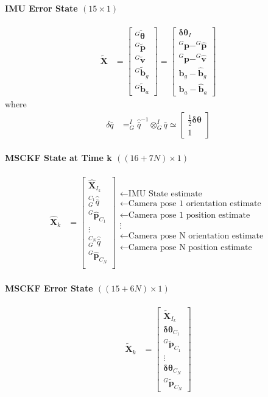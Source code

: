 \documentclass[10pt,letterpaper,fleqn,oneside]{article}
\newcommand{\nl}{\\[0.5em]}
\def\Vec#1{\mathbf{#1}} %
\newcommand{\bbm}{\begin{bmatrix}}
\newcommand{\ebm}{\end{bmatrix}}
\begin{document}
\paragraph{IMU Error State $(15\times1)$}
\begin{align}
\widetilde{\Vec{X}} &= 	\bbm ^G\widetilde{\boldsymbol{\theta}} \nl
										^G\widetilde{\Vec{p}} \nl
										^G\widetilde{\Vec{v}} \nl
										^G\widetilde{\Vec{b}}_g \nl
										^G\widetilde{\Vec{b}}_a
								\ebm
								=
								\bbm
										\boldsymbol{\delta\theta}_I \nl
										^G\Vec{p} - ^G\hat{\Vec{p}} \nl
										^G\Vec{p} - ^G\hat{\Vec{v}} \nl
										\Vec{b}_g - \hat{\Vec{b}}_g \nl
										\Vec{b}_a - \hat{\Vec{b}}_a 
								\ebm
\end{align}
where
\begin{align}
\delta\bar{q} &= ^I_G\hat{\bar{q}}^{-1} \otimes ^I_G\bar{q} \simeq \bbm \frac{1}{2}\boldsymbol{\delta\theta} \nl 1 \ebm
\end{align}

\paragraph{MSCKF State at Time k $((16+7N)\times1)$}
\begin{align}
\hat{\Vec{X}}_k &= \bbm	\hat{\Vec{X}}_{I_k} \nl
										^{C_1}_G\hat{\bar{q}} \nl
										^G\hat{\Vec{p}}_{C_1} \nl
										\vdots \nl
										^{C_N}_G\hat{\bar{q}} \nl
										^G\hat{\Vec{p}}_{C_N} \nl										
								\ebm
								\begin{array}{l}
								\leftarrow \text{IMU State estimate} \nl
								\leftarrow \text{Camera pose 1 orientation estimate} \nl
								\leftarrow \text{Camera pose 1 position estimate} \nl
								\vdots \nl
								\leftarrow \text{Camera pose N orientation estimate} \nl
								\leftarrow \text{Camera pose N position estimate} \nl
								\end{array}		
\end{align}

\paragraph{MSCKF Error State $((15 + 6N) \times 1)$}
\begin{align}
\widetilde{\Vec{X}}_k &= \bbm	\widetilde{\Vec{X}}_{I_k} \nl
											\boldsymbol{\delta\theta}_{C_1} \nl
											^G\widetilde{\Vec{p}}_{C_1} \nl
											\vdots \nl
											\boldsymbol{\delta\theta}_{C_N} \nl
											^G\widetilde{\Vec{p}}_{C_N}
								\ebm
\end{align}
\end{document}
